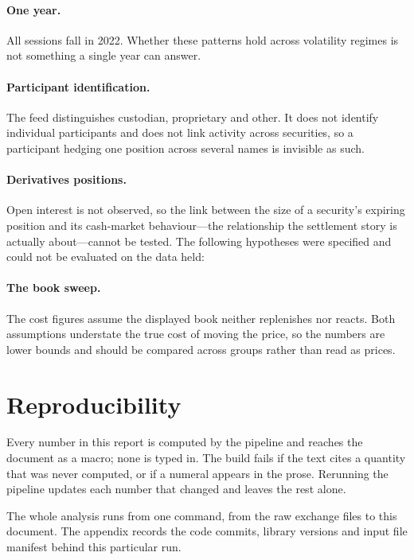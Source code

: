 \paragraph{One year.} All sessions fall in 2022. Whether these patterns hold across
volatility regimes is not something a single year can answer.

\paragraph{Participant identification.} The feed distinguishes custodian, proprietary and
other. It does not identify individual participants and does not link activity across
securities, so a participant hedging one position across several names is invisible as such.

\paragraph{Derivatives positions.} Open interest is not observed, so the link between the
size of a security's expiring position and its cash-market behaviour---the relationship the
settlement story is actually about---cannot be tested. The following hypotheses were
specified and could not be evaluated on the data held:



\paragraph{The book sweep.} The cost figures assume the displayed book neither replenishes
nor reacts. Both assumptions understate the true cost of moving the price, so the numbers are
lower bounds and should be compared across groups rather than read as prices.

\section{Reproducibility}\label{sec:repro}

Every number in this report is computed by the pipeline and reaches the document as a macro;
none is typed in. The build fails if the text cites a quantity that was never computed, or if
a numeral appears in the prose. Rerunning the pipeline updates each number that changed and
leaves the rest alone.

The whole analysis runs from one command, from the raw exchange files to this document. The
appendix records the code commits, library versions and input file manifest behind this
particular run.
